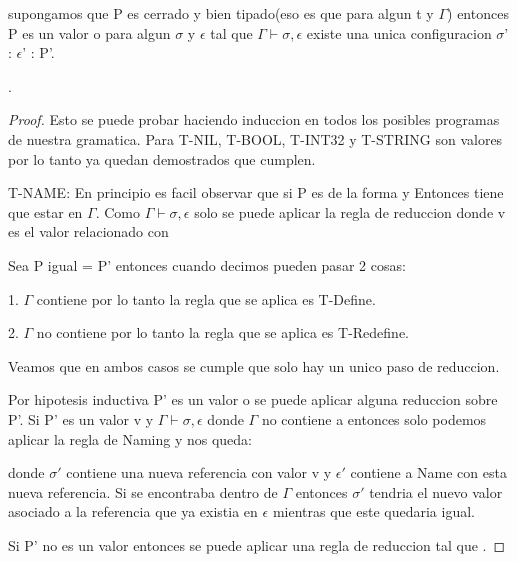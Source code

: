 \begin{theorem}[Progreso]
    supongamos que P es cerrado y bien  tipado(eso es que
     para algun t y $\Gamma$)
    entonces P es un valor o para algun $\sigma$ y $\epsilon$ tal que
    $\Gamma \vdash \sigma, \epsilon$ existe una unica configuracion $\sigma$' : $\epsilon$' : P'.  

     \fullarrow {}.

\end{theorem}
\begin{proof}
Esto se puede probar haciendo induccion en todos los posibles programas de nuestra
gramatica. Para T-NIL, T-BOOL, T-INT32 y T-STRING son valores por lo tanto ya quedan demostrados que cumplen.

T-NAME: En principio es facil observar que si P es de la forma 
y  Entonces  tiene que estar en $\Gamma$. Como $\Gamma 
\vdash \sigma, \epsilon$ solo se puede aplicar la regla de reduccion 
 \fullarrow {}
donde v es el valor relacionado con 

Sea P igual  = P' entonces cuando decimos 
 pueden pasar 2 cosas:

    1. $\Gamma$ contiene  por lo tanto la regla que se aplica es
    T-Define.

    2. $\Gamma$ no contiene  por lo tanto la regla que se aplica
    es T-Redefine.

Veamos que en ambos casos se cumple que solo hay un unico paso de reduccion.

Por hipotesis inductiva P' es un valor o se puede aplicar alguna 
reduccion sobre P'. Si P' es un valor v y $\Gamma \vdash \sigma, \epsilon$
 donde $\Gamma$ no contiene a  entonces solo podemos aplicar 
 la regla de Naming y nos queda:

 \fullarrow {}

donde $\sigma'$ contiene una nueva referencia con valor v y $\epsilon'$
 contiene a Name con esta nueva referencia.
Si  se encontraba dentro de $\Gamma$ entonces $\sigma'$
 tendria el nuevo valor asociado a la referencia
que ya existia en $\epsilon$ mientras que este quedaria igual.

Si P' no es un valor entonces se puede aplicar una regla de reduccion tal que
  \fullarrow {}.


\end{proof}
